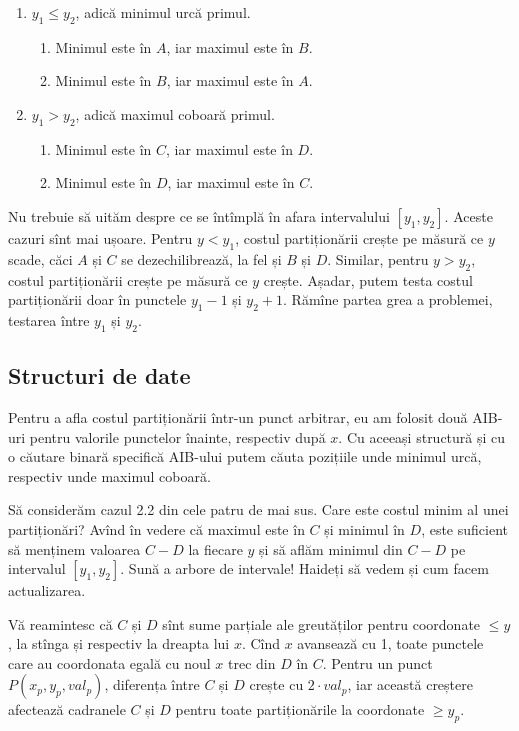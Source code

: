 \begin{enumerate}
  \item $y_1 \leq y_2$, adică minimul urcă primul.

  \begin{enumerate}
    \item Minimul este în $A$, iar maximul este în $B$.
    \item Minimul este în $B$, iar maximul este în $A$.
  \end{enumerate}

  \item $y_1 > y_2$, adică maximul coboară primul.

  \begin{enumerate}
    \item Minimul este în $C$, iar maximul este în $D$.
    \item Minimul este în $D$, iar maximul este în $C$.
  \end{enumerate}
\end{enumerate}

Nu trebuie să uităm despre ce se întîmplă în afara intervalului $[y_1, y_2]$. Aceste cazuri sînt mai ușoare. Pentru $y < y_1$, costul partiționării crește pe măsură ce $y$ scade, căci $A$ și $C$ se dezechilibrează, la fel și $B$ și $D$. Similar, pentru $y > y_2$, costul partiționării crește pe măsură ce $y$ crește. Așadar, putem testa costul partiționării doar în punctele $y_1 - 1$ și $y_2 + 1$. Rămîne partea grea a problemei, testarea între $y_1$ și $y_2$.

\subsection{Structuri de date}

Pentru a afla costul partiționării într-un punct arbitrar, eu am folosit două AIB-uri pentru valorile punctelor înainte, respectiv după $x$. Cu aceeași structură și cu o căutare binară specifică AIB-ului putem căuta pozițiile unde minimul urcă, respectiv unde maximul coboară.

Să considerăm cazul 2.2 din cele patru de mai sus. Care este costul minim al unei partiționări? Avînd în vedere că maximul este în $C$ și minimul în $D$, este suficient să menținem valoarea $C-D$ la fiecare $y$ și să aflăm minimul din $C-D$ pe intervalul $[y_1, y_2]$. Sună a arbore de intervale! Haideți să vedem și cum facem actualizarea.

Vă reamintesc că $C$ și $D$ sînt sume parțiale ale greutăților pentru coordonate $\leq y$, la stînga și respectiv la dreapta lui $x$. Cînd $x$ avansează cu 1, toate punctele care au coordonata egală cu noul $x$ trec din $D$ în $C$. Pentru un punct $P(x_p, y_p, val_p)$, diferența între $C$ și $D$ crește cu $2 \cdot val_p$, iar această creștere afectează cadranele $C$ și $D$ pentru toate partiționările la coordonate $\geq y_p$.

